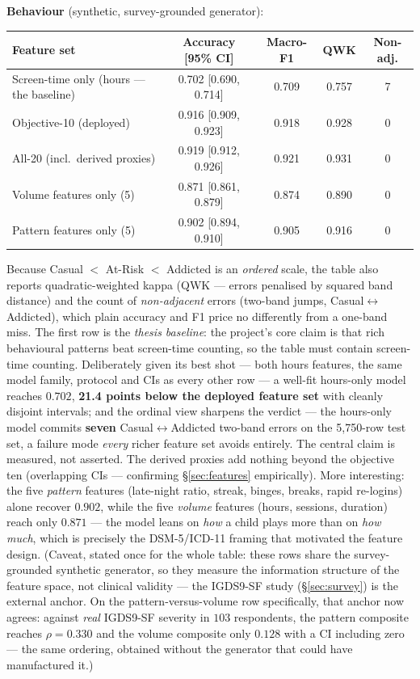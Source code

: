 \documentclass[11pt,a4paper]{article}
\begin{document}
\textbf{Behaviour} (synthetic, survey-grounded generator):
\begin{center}
\begin{tabular}{lcccc}
\toprule
\textbf{Feature set} & \textbf{Accuracy [95\% CI]} & \textbf{Macro-F1} & \textbf{QWK} & \textbf{Non-adj.} \\
\midrule
Screen-time only (hours --- the baseline) & 0.702 [0.690, 0.714] & 0.709 & 0.757 & 7 \\
Objective-10 (deployed)          & 0.916 [0.909, 0.923] & 0.918 & 0.928 & 0 \\
All-20 (incl.\ derived proxies)  & 0.919 [0.912, 0.926] & 0.921 & 0.931 & 0 \\
Volume features only (5)         & 0.871 [0.861, 0.879] & 0.874 & 0.890 & 0 \\
Pattern features only (5)        & 0.902 [0.894, 0.910] & 0.905 & 0.916 & 0 \\
\bottomrule
\end{tabular}
\end{center}
Because Casual $<$ At-Risk $<$ Addicted is an \emph{ordered} scale, the table also
reports quadratic-weighted kappa (QWK --- errors penalised by squared band
distance) and the count of \emph{non-adjacent} errors (two-band jumps,
Casual$\leftrightarrow$Addicted), which plain accuracy and F1 price no differently
from a one-band miss. The first row is the \emph{thesis baseline}: the project's
core claim is that rich behavioural patterns beat screen-time counting, so the
table must contain screen-time counting. Deliberately given its best shot --- both
hours features, the same model family, protocol and CIs as every other row --- a
well-fit hours-only model reaches $0.702$, \textbf{21.4 points below the deployed
feature set} with cleanly disjoint intervals; and the ordinal view sharpens the
verdict --- the hours-only model commits \textbf{seven} Casual$\leftrightarrow$Addicted
two-band errors on the 5{,}750-row test set, a failure mode \emph{every} richer
feature set avoids entirely. The central claim is measured, not asserted. The derived
proxies add nothing beyond the objective ten (overlapping CIs --- confirming
\S\ref{sec:features} empirically). More interesting: the five \emph{pattern}
features (late-night ratio, streak, binges, breaks, rapid re-logins) alone recover
$0.902$, while the five \emph{volume} features (hours, sessions, duration) reach
only $0.871$ --- the model leans on \emph{how} a child plays more than on \emph{how
much}, which is precisely the DSM-5/ICD-11 framing that motivated the feature
design. (Caveat, stated once for the whole table: these rows share the
survey-grounded synthetic generator, so they measure the information structure of
the feature space, not clinical validity --- the IGDS9-SF study
(\S\ref{sec:survey}) is the external anchor. On the pattern-versus-volume row
specifically, that anchor now agrees: against \emph{real} IGDS9-SF severity in
$103$ respondents, the pattern composite reaches $\rho = 0.330$ and the volume
composite only $0.128$ with a CI including zero --- the same ordering, obtained
without the generator that could have manufactured it.)
\end{document}
